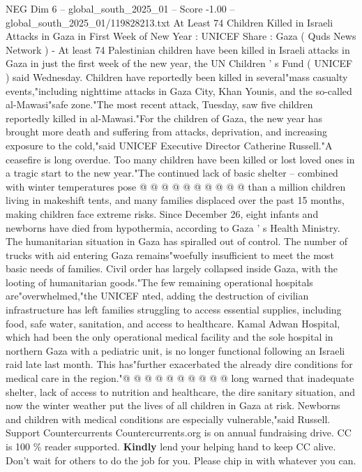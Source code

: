 \begin{textsample}{NEG Dim 6 – global\_south\_2025\_01 – Score -1.00 – global\_south\_2025\_01/119828213.txt}  \label{ex:f6_neg_019}
At Least 74 Children Killed in Israeli Attacks in Gaza in First Week of New Year : UNICEF Share : Gaza ( Quds News Network ) - At least 74 Palestinian children have been killed in Israeli attacks in Gaza in just the first week of the new year, the UN Children ' s Fund ( UNICEF ) said Wednesday.
Children have reportedly been killed in several"mass casualty events,"including nighttime attacks in Gaza City, Khan Younis, and the so-called al-Mawasi"safe zone."The most recent attack, Tuesday, saw five children reportedly killed in al-Mawasi."For the children of Gaza, the new year has brought more death and suffering from attacks, deprivation, and increasing exposure to the cold,"said UNICEF Executive Director Catherine Russell."A ceasefire is long overdue.
Too many children have been killed or lost loved ones in a tragic start to the new year."The continued lack of basic shelter -- combined with winter temperatures pose @ @ @ @ @ @ @ @ @ @ than a million children living in makeshift tents, and many families displaced over the past 15 months, making children face extreme risks.
Since December 26, eight infants and newborns have died from hypothermia, according to Gaza ' s Health Ministry.
The humanitarian situation in Gaza has spiralled out of control.
The number of trucks with aid entering Gaza remains"woefully insufficient to meet the most basic needs of families.
Civil order has largely collapsed inside Gaza, with the looting of humanitarian goods."The few remaining operational hospitals are"overwhelmed,"the UNICEF nted, adding the destruction of civilian infrastructure has left families struggling to access essential supplies, including food, safe water, sanitation, and access to healthcare.
Kamal Adwan Hospital, which had been the only operational medical facility and the sole hospital in northern Gaza with a pediatric unit, is no longer functional following an Israeli raid late last month.
This has"further exacerbated the already dire conditions for medical care in the region."@ @ @ @ @ @ @ @ @ @ long warned that inadequate shelter, lack of access to nutrition and healthcare, the dire sanitary situation, and now the winter weather put the lives of all children in Gaza at risk.
Newborns and children with medical conditions are especially vulnerable,"said Russell.
Support Countercurrents Countercurrents.org is on annual fundraising drive.
CC is 100 \% reader supported. \textbf{Kindly} lend your helping hand to keep CC alive.
Don't wait for others to do the job for you.
Please chip in with whatever you can.

\end{textsample}
